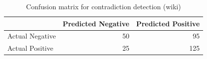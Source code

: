 \begin{table}
\caption{Confusion matrix for contradiction detection (wiki)}
\label{tab:confusion_matrix}
\begin{tabular}{lrr}
\toprule
 & Predicted Negative & Predicted Positive \\
\midrule
Actual Negative & 50 & 95 \\
Actual Positive & 25 & 125 \\
\bottomrule
\end{tabular}
\end{table}
